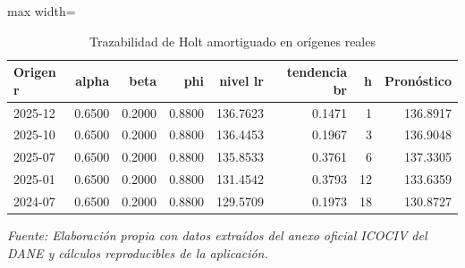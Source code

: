 \begin{table}[H]
\centering
\caption{Trazabilidad de Holt amortiguado en orígenes reales}
\label{tab:ejemplo_holt_amortiguado_vias_urbanas}
\scriptsize
\begin{adjustbox}{max width=\linewidth}
\begin{tabular}{lrrrrrrr}
\toprule
Origen r & alpha & beta & phi & nivel lr & tendencia br & h & Pronóstico \\
\midrule
2025-12 & 0.6500 & 0.2000 & 0.8800 & 136.7623 & 0.1471 & 1 & 136.8917 \\
2025-10 & 0.6500 & 0.2000 & 0.8800 & 136.4453 & 0.1967 & 3 & 136.9048 \\
2025-07 & 0.6500 & 0.2000 & 0.8800 & 135.8533 & 0.3761 & 6 & 137.3305 \\
2025-01 & 0.6500 & 0.2000 & 0.8800 & 131.4542 & 0.3793 & 12 & 133.6359 \\
2024-07 & 0.6500 & 0.2000 & 0.8800 & 129.5709 & 0.1973 & 18 & 130.8727 \\
\bottomrule
\end{tabular}
\end{adjustbox}
\par\footnotesize\textit{Fuente: Elaboración propia con datos extraídos del anexo oficial ICOCIV del DANE y cálculos reproducibles de la aplicación.}
\end{table}
